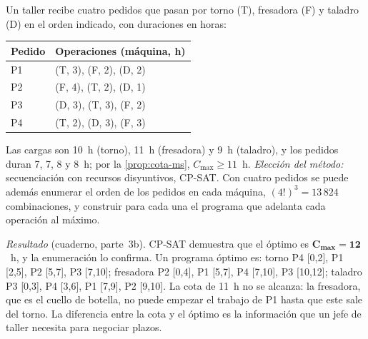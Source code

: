 \begin{ejemplo}\label{ej:jobshop}
Un taller recibe cuatro pedidos que pasan por torno (T), fresadora (F) y taladro (D) en el orden indicado, con duraciones en horas:
\begin{center}\small
\begin{tabular}{@{}ll@{}}
\toprule
Pedido & Operaciones (máquina, h) \\
\midrule
P1 & (T, 3), (F, 2), (D, 2) \\
P2 & (F, 4), (T, 2), (D, 1) \\
P3 & (D, 3), (T, 3), (F, 2) \\
P4 & (T, 2), (D, 3), (F, 3) \\
\bottomrule
\end{tabular}
\end{center}
Las cargas son 10~h (torno), 11~h (fresadora) y 9~h (taladro), y los pedidos duran 7, 7, 8 y 8~h; por la \cref{prop:cota-ms}, $C_{\max}\ge 11$~h. \emph{Elección del método:} secuenciación con recursos disyuntivos, CP-SAT. Con cuatro pedidos se puede además enumerar el orden de los pedidos en cada máquina, $(4!)^{3}=13\,824$ combinaciones, y construir para cada una el programa que adelanta cada operación al máximo.

\emph{Resultado} (cuaderno, parte~3b). CP-SAT demuestra que el óptimo es $\bm{C_{\max}=12}$~h, y la enumeración lo confirma. Un programa óptimo es: torno P4 [0,2], P1 [2,5], P2 [5,7], P3 [7,10]; fresadora P2 [0,4], P1 [5,7], P4 [7,10], P3 [10,12]; taladro P3 [0,3], P4 [3,6], P1 [7,9], P2 [9,10]. La cota de 11~h no se alcanza: la fresadora, que es el cuello de botella, no puede empezar el trabajo de P1 hasta que este sale del torno. La diferencia entre la cota y el óptimo es la información que un jefe de taller necesita para negociar plazos.
\end{ejemplo}

